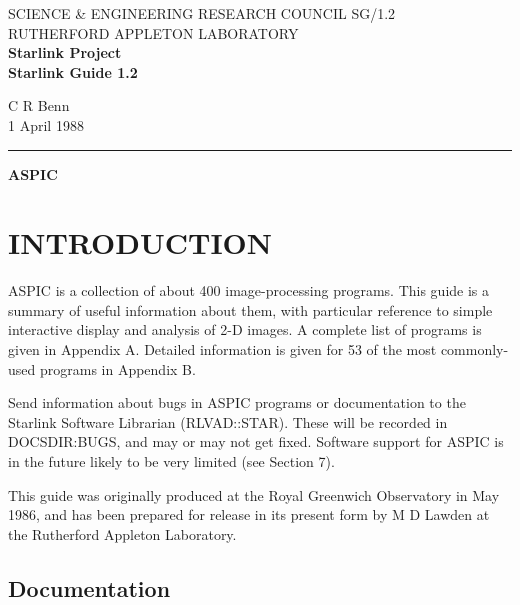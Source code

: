\pagestyle{myheadings}
\setlength{\textwidth}{160mm}
\setlength{\textheight}{240mm}
\setlength{\topmargin}{-5mm}
\setlength{\oddsidemargin}{0mm}
\setlength{\evensidemargin}{0mm}
\setlength{\parindent}{0mm}
\setlength{\parskip}{\medskipamount}
\setlength{\unitlength}{1mm}


\thispagestyle{empty}
SCIENCE \& ENGINEERING RESEARCH COUNCIL \hfill SG/1.2\\
RUTHERFORD APPLETON LABORATORY\\
{\large\bf Starlink Project\\}
{\large\bf Starlink Guide 1.2}
\begin{flushright}
C R Benn\\
1 April 1988
\end{flushright}
\vspace{-4mm}
\rule{\textwidth}{0.5mm}
\vspace{5mm}
\begin{center}
{\Large\bf ASPIC}
\end{center}
\vspace{5mm}

{\setlength{\parskip}{0mm}
\tableofcontents}

\newpage

\section {INTRODUCTION}

ASPIC is a collection of about 400 image-processing programs.
This guide is a summary of useful information about them, with particular
reference to simple interactive display and analysis of 2-D images.
A complete list of programs is given in Appendix A.
Detailed information is given for 53 of the most commonly-used
programs in Appendix B.

Send information about bugs in ASPIC programs or documentation to the
Starlink Software Librarian (RLVAD::STAR).
These will be recorded in DOCSDIR:BUGS,
and may or may not get fixed.
Software support for ASPIC is in the future likely to
be very limited (see Section 7).

This guide was originally produced at the Royal Greenwich Observatory
in May 1986, and
has been prepared for release in its present form by M D Lawden
at the Rutherford Appleton Laboratory.

\subsection {Documentation}

